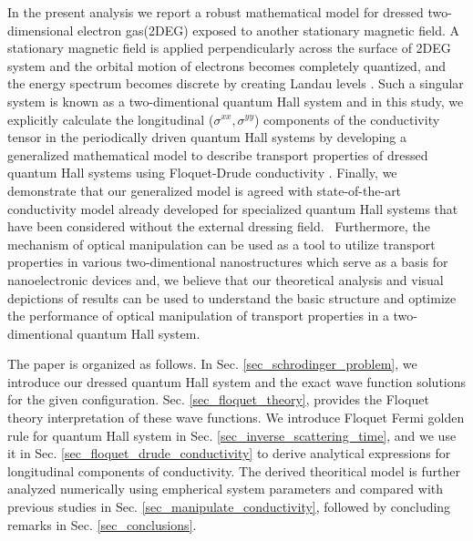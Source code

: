 In the present analysis we report a robust mathematical model for dressed two-dimensional electron gas(2DEG) exposed to another stationary magnetic field.
A stationary magnetic field is applied perpendicularly across the surface of 2DEG system and the orbital motion of electrons becomes completely quantized, and the energy spectrum becomes discrete by creating Landau levels \cite{landau30}.
Such a singular system is known as a two-dimentional quantum Hall system and in this study, we explicitly calculate the longitudinal  ($\sigma^{xx},\sigma^{yy}$) components of the conductivity tensor in the periodically driven quantum Hall systems by developing a generalized mathematical model to describe transport properties of dressed quantum Hall systems using Floquet-Drude conductivity \cite{wackerl20}.
Finally, we demonstrate that our generalized model is agreed with state-of-the-art conductivity model \cite{endo09} already developed for specialized quantum Hall systems that have been considered without the external dressing field. 
Furthermore, the mechanism of optical manipulation can be used as a tool to utilize transport properties in various two-dimentional nanostructures which serve as a basis for nanoelectronic devices and, we believe that our theoretical analysis and visual depictions of results can be used to understand the basic structure and optimize the performance of optical manipulation of transport properties in a two-dimentional quantum Hall system.

The paper is organized as follows. In Sec.  \ref{sec_schrodinger_problem}, we introduce our dressed quantum Hall system and the exact wave function solutions for the given configuration. Sec. \ref{sec_floquet_theory}, provides the Floquet theory interpretation of these wave functions.
We introduce Floquet Fermi golden rule for quantum Hall system in Sec. \ref{sec_inverse_scattering_time}, and we use it in Sec. \ref{sec_floquet_drude_conductivity} to derive analytical expressions for longitudinal components of conductivity.
The derived theoritical model is further analyzed numerically using empherical system parameters and compared with previous studies in Sec. \ref{sec_manipulate_conductivity}, followed by concluding remarks in Sec. \ref{sec_conclusions}.

